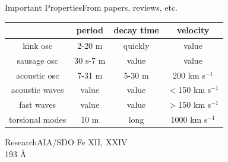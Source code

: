 \documentclass[11pt,table]{beamer}
\begin{document}
\begin{frame}{Important Properties}{From papers, reviews, etc.}
\begin{center}
    \begin{tabular}{c|c|c|c|}
        \cline{2-4} & {\textbf{\textcolor{gsa}{period}}} &
        {\textbf{\textcolor{gsa}{decay time}}} &
        {\textbf{\textcolor{gsa}{velocity}}}\\
        \hline \multicolumn{0}{|c|}{\textcolor{bblue}{kink osc}} &
            2{-}20 m & quickly & value\\
        \hline \multicolumn{0}{|c|}{\textcolor{bblue}{sausage osc}} &
            30 s{-}7 m & value & value\\
        \hline \multicolumn{0}{|c|}{\textcolor{bblue}{acoustic osc}} &
            7{-}31 m & 5{-}30 m & 200 km s$^{-1}$\\
        \hline \multicolumn{0}{|c|}{\textcolor{bblue}{acoustic waves}} &
            value & value & $<$150 km s$^{-1}$\\
        \hline \multicolumn{0}{|c|}{\textcolor{bblue}{fast waves}} &
            value & value & $>$150 km s$^{-1}$\\
        \hline \multicolumn{0}{|c|}{\textcolor{bblue}{torsional modes}} &
            10 m & long & 1000 km s$^{-1}$\\
        \hline
    \end{tabular}
\end{center}
\end{frame}%
{%
\begin{frame}[t]{Research}{AIA/SDO}
    \hspace{-2em}Fe {\footnotesize XII, XXIV}\\
    \hspace{-2em}193 \AA{}\\
\end{frame}}%
%
\end{document}
